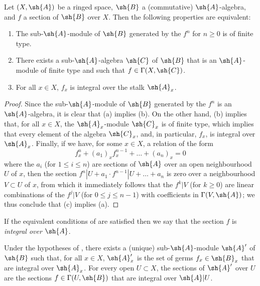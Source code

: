 \begin{proposition}[6.3.1]
\label{II.6.3.1}
Let $(X,\sh{A})$ be a ringed space, $\sh{B}$ a (commutative) $\sh{A}$-algebra, and $f$ a section of $\sh{B}$ over $X$.
Then the following properties are equivalent:
\begin{enumerate}
  \item[a)] The sub-$\sh{A}$-module of $\sh{B}$ generated by the $f^n$ for $n\geq0$  is of finite type.
  \item[b)] There exists a sub-$\sh{A}$-algebra $\sh{C}$ of $\sh{B}$ that is an $\sh{A}$-module of finite type and such that $f\in\Gamma(X,\sh{C})$.
  \item[c)] For all $x\in X$, $f_x$ is integral over the stalk $\sh{A}_x$.
\end{enumerate}
\end{proposition}

\begin{proof}
Since the sub-$\sh{A}$-module of $\sh{B}$ generated by the $f^n$ is an $\sh{A}$-algebra, it is clear that (a) implies (b).
On the other hand, (b) implies that, for all $x\in X$, the $\sh{A}_x$-module $\sh{C}_x$ is of finite type, which implies that every element of the algebra $\sh{C}_x$, and, in particular, $f_x$, is integral over $\sh{A}_x$.
Finally, if we have, for some $x\in X$, a relation of the form
\[
  f_x^n + (a_1)_xf_x^{n-1} + \ldots + (a_n)_x = 0
\]
where the $a_i$ (for $1\leq i\leq n$) are sections of $\sh{A}$ over an open neighbourhood $U$ of $x$, then the section $f^n|U+a_1\cdot f^{n-1}|U+\ldots+a_n$ is zero over a neighbourhood $V\subset U$ of $x$, from which it immediately follows that the $f^k|V$ (for $k\geq0$) are linear combinations of the $f^j|V$ (for $0\leq j\leq n-1$) with coefficients in $\Gamma(V,\sh{A})$;
we thus conclude that (c) implies (a).
\end{proof}

If the equivalent conditions of  are satisfied then we say that the section $f$ is \emph{integral over $\sh{A}$}.

\begin{corollary}[6.3.2]
\label{II.6.3.2}
Under the hypotheses of , there exists a (unique) sub-$\sh{A}$-module $\sh{A}'$ of $\sh{B}$ such that, for all $x\in X$, $\sh{A}'_x$ is the set of germs $f_x\in\sh{B}_x$ that are integral over $\sh{A}_x$.
For every open $U\subset X$, the sections of $\sh{A}'$ over $U$ are the sections $f\in\Gamma(U,\sh{B})$ that are integral over $\sh{A}|U$.
\end{corollary}

